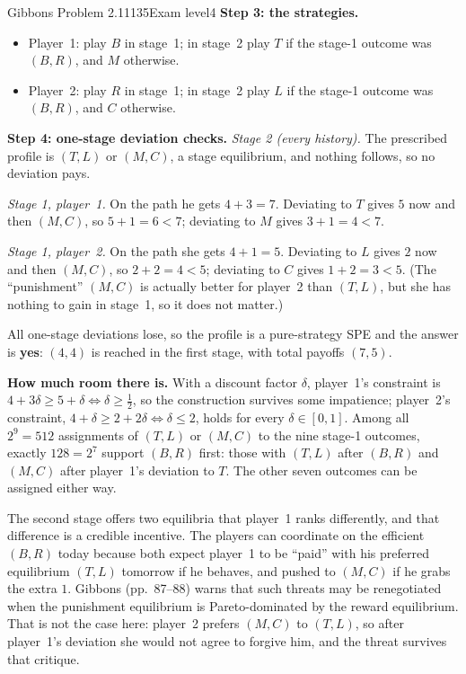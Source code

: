 \begin{exsol}{Gibbons Problem 2.11}{135}{Exam level}{4}
\textbf{Step 3: the strategies.}
\begin{itemize}
  \item Player~1: play $B$ in stage~1; in stage~2 play $T$ if the stage-1 outcome was $(B,R)$, and
  $M$ otherwise.
  \item Player~2: play $R$ in stage~1; in stage~2 play $L$ if the stage-1 outcome was $(B,R)$, and
  $C$ otherwise.
\end{itemize}

\textbf{Step 4: one-stage deviation checks.}
\emph{Stage 2 (every history).} The prescribed profile is $(T,L)$ or $(M,C)$, a stage equilibrium,
and nothing follows, so no deviation pays.

\emph{Stage 1, player~1.} On the path he gets $4 + 3 = 7$. Deviating to $T$ gives $5$ now and
then $(M,C)$, so $5 + 1 = 6 < 7$; deviating to $M$ gives $3 + 1 = 4 < 7$.

\emph{Stage 1, player~2.} On the path she gets $4 + 1 = 5$. Deviating to $L$ gives $2$ now and then
$(M,C)$, so $2 + 2 = 4 < 5$; deviating to $C$ gives $1 + 2 = 3 < 5$. (The ``punishment'' $(M,C)$ is
actually better for player~2 than $(T,L)$, but she has nothing to gain in stage~1, so it does not
matter.)

All one-stage deviations lose, so the profile is a pure-strategy SPE and the answer is \textbf{yes}:
$(4,4)$ is reached in the first stage, with total payoffs $(7, 5)$.

\textbf{How much room there is.} With a discount factor $\delta$, player~1's constraint is
$4 + 3\delta \ge 5 + \delta \iff \delta \ge \frac12$, so the construction survives some impatience;
player~2's constraint, $4 + \delta \ge 2 + 2\delta \iff \delta \le 2$, holds for every
$\delta \in [0,1]$. Among all $2^9 = 512$
assignments of $(T,L)$ or $(M,C)$ to the nine stage-1 outcomes, exactly $128 = 2^7$ support $(B,R)$
first: those with $(T,L)$ after $(B,R)$ and $(M,C)$ after player~1's deviation to $T$. The other
seven outcomes can be assigned either way.

\interp The second stage offers two equilibria that player~1 ranks differently, and that difference
is a credible incentive. The players can coordinate on the efficient $(B,R)$ today because both
expect player~1 to be ``paid'' with his preferred equilibrium $(T,L)$ tomorrow if he behaves, and
pushed to $(M,C)$ if he grabs the extra $1$. Gibbons (pp.~87--88) warns that such
threats may be renegotiated when the punishment equilibrium is Pareto-dominated by the reward
equilibrium. That is not the case here: player~2 prefers $(M,C)$ to $(T,L)$, so after player~1's
deviation she would not agree to forgive him, and the threat survives that critique.


\end{exsol}
